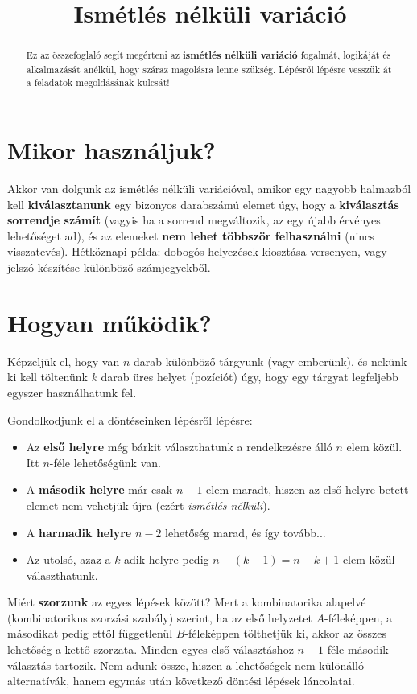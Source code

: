 \documentclass[11pt,a4paper]{article}
\title{Ismétlés nélküli variáció}
\author{}
\date{}
\begin{document}
\maketitle

\begin{abstract}
\noindent Ez az összefoglaló segít megérteni az \textbf{ismétlés nélküli variáció} fogalmát, logikáját és alkalmazását anélkül, hogy száraz magolásra lenne szükség. Lépésről lépésre vesszük át a feladatok megoldásának kulcsát!
\end{abstract}

\section{Mikor használjuk?}
Akkor van dolgunk az ismétlés nélküli variációval, amikor egy nagyobb halmazból kell \textbf{kiválasztanunk} egy bizonyos darabszámú elemet úgy, hogy a \textbf{kiválasztás sorrendje számít} (vagyis ha a sorrend megváltozik, az egy újabb érvényes lehetőséget ad), és az elemeket \textbf{nem lehet többször felhasználni} (nincs visszatevés). Hétköznapi példa: dobogós helyezések kiosztása versenyen, vagy jelszó készítése különböző számjegyekből.

\section{Hogyan működik?}
Képzeljük el, hogy van $n$ darab különböző tárgyunk (vagy emberünk), és nekünk ki kell töltenünk $k$ darab üres helyet (pozíciót) úgy, hogy egy tárgyat legfeljebb egyszer használhatunk fel. 

Gondolkodjunk el a döntéseinken lépésről lépésre:
\begin{itemize}
    \item Az \textbf{első helyre} még bárkit választhatunk a rendelkezésre álló $n$ elem közül. Itt $n$-féle lehetőségünk van.
    \item A \textbf{második helyre} már csak $n-1$ elem maradt, hiszen az első helyre betett elemet nem vehetjük újra (ezért \emph{ismétlés nélküli}).
    \item A \textbf{harmadik helyre} $n-2$ lehetőség marad, és így tovább...
    \item Az utolsó, azaz a $k$-adik helyre pedig $n - (k-1) = n - k + 1$ elem közül választhatunk.
\end{itemize}

Miért \textbf{szorzunk} az egyes lépések között? Mert a kombinatorika alapelvé (kombinatorikus szorzási szabály) szerint, ha az első helyzetet $A$-féleképpen, a másodikat pedig ettől függetlenül $B$-féleképpen tölthetjük ki, akkor az összes lehetőség a kettő szorzata. Minden egyes első választáshoz $n-1$ féle második választás tartozik. Nem adunk össze, hiszen a lehetőségek nem különálló alternatívák, hanem egymás után következő döntési lépések láncolatai.
\end{document}
